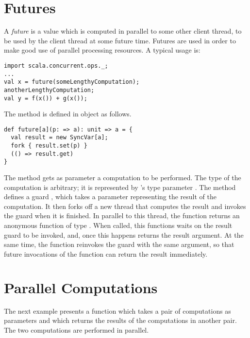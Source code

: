 {\section{Futures}
\label{sec:futures}

A {\em future} is a value which is computed in parallel to some other
client thread, to be used by the client thread at some future time.
Futures are used in order to make good use of parallel processing
resources.  A typical usage is:

\begin{lstlisting}
import scala.concurrent.ops._;
...
val x = future(someLengthyComputation);
anotherLengthyComputation;
val y = f(x()) + g(x());
\end{lstlisting}

The  method is defined in object
 as follows.
\begin{lstlisting}
def future[a](p: => a): unit => a = {
  val result = new SyncVar[a];
  fork { result.set(p) }
  (() => result.get)
}
\end{lstlisting}

The  method gets as parameter a computation  to
be performed. The type of the computation is arbitrary; it is
represented by 's type parameter .  The
 method defines a guard , which takes a
parameter representing the result of the computation. It then forks
off a new thread that computes the result and invokes the
 guard when it is finished. In parallel to this thread,
the function returns an anonymous function of type .
When called, this functions waits on the result guard to be
invoked, and, once this happens returns the result argument.
At the same time, the function reinvokes the  guard with
the same argument, so that future invocations of the function can
return the result immediately.

\section{Parallel Computations}

The next example presents a function  which takes a pair of
computations as parameters and which returns the results of the computations
in another pair. The two computations are performed in parallel.

}

